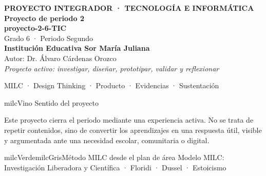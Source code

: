 \documentclass[11pt,letterpaper]{article}
\begin{document}
\thispagestyle{empty}

\vspace*{.85cm}
\begin{tcolorbox}[
  enhanced,colback=milcVino,colframe=milcVino,arc=12mm,width=.86\textwidth,
  boxrule=0pt,left=12mm,right=12mm,top=11mm,bottom=11mm,center,
  overlay={\draw[milcMagenta,line width=2pt,dash pattern=on 9pt off 8pt,rounded corners=10mm]
  ([xshift=7mm,yshift=-7mm]frame.north west) rectangle ([xshift=-7mm,yshift=7mm]frame.south east);}]
  \centering
  {\sffamily\bfseries\color{white}\fontsize{15}{17}\selectfont PROYECTO INTEGRADOR · TECNOLOGÍA E INFORMÁTICA}\\[1.0cm]
  {\sffamily\bfseries\color{white}\fontsize{30}{33}\selectfont Proyecto de periodo 2}\\[3mm]
  {\sffamily\bfseries\color{milcMostaza}\fontsize{25}{28}\selectfont proyecto-2-6-TIC}\\[8mm]
  {\sffamily\color{white}\Large Grado 6 · Periodo Segundo}\\[1.0cm]
  {\sffamily\bfseries\color{white}\large Institución Educativa Sor María Juliana}\\[2mm]
  {\sffamily\color{white}Autor: Dr. Álvaro Cárdenas Orozco}\\[4mm]
  {\sffamily\itshape\color{white}Proyecto activo: investigar, diseñar, prototipar, validar y reflexionar}
\end{tcolorbox}
\vfill
\begin{tcolorbox}[enhanced,colback=milcVino!72!black,colframe=milcVino!72!black,arc=5mm,boxrule=0pt,width=.86\textwidth,left=6mm,right=6mm,top=4mm,bottom=4mm,center]
{\color{white}\sffamily\small MILC · Design Thinking · Producto · Evidencias · Sustentación}
\end{tcolorbox}

\newpage
\begin{titlebox}{milcVino}
Sentido del proyecto
\end{titlebox}
\begin{multicols}{2}
Este proyecto cierra el periodo mediante una experiencia activa. No se trata de repetir contenidos, sino de convertir los aprendizajes en una respuesta útil, visible y argumentada ante una necesidad escolar, comunitaria o digital.

\columnbreak
\begin{softbox}{milcVerde}{milcGris}{Método MILC desde el plan de área}
Modelo MILC: Investigación Liberadora y Científica · Floridi · Dussel · Estoicismo
\end{softbox}
\end{multicols}
\end{document}
